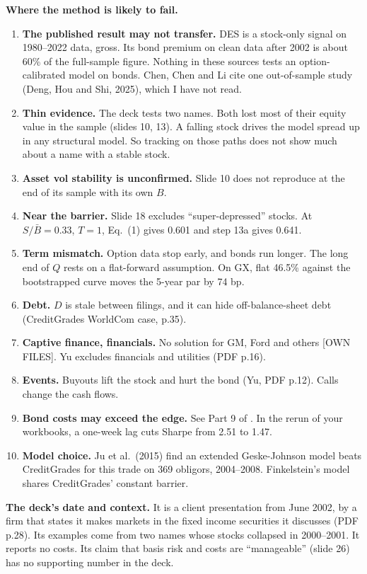 \documentclass[10pt,a4paper]{article}
\newcommand{\OWN}{\textsf{\footnotesize\textcolor{tagother}{[OWN FILES]}}}
\newcommand{\Bbar}{\bar{B}}
\begin{document}
\textbf{Where the method is likely to fail.}
\begin{enumerate}[nosep]
\item \textbf{The published result may not transfer.} DES is a stock-only signal on 1980--2022 data, gross. Its bond premium on clean data after 2002 is about 60\% of the full-sample figure. Nothing in these sources tests an option-calibrated model on bonds. Chen, Chen and Li cite one out-of-sample study (Deng, Hou and Shi, 2025), which I have not read.
\item \textbf{Thin evidence.} The deck tests two names. Both lost most of their equity value in the sample (slides 10, 13). A falling stock drives the model spread up in any structural model. So tracking on those paths does not show much about a name with a stable stock.
\item \textbf{Asset vol stability is unconfirmed.} Slide 10 does not reproduce at the end of its sample with its own $B$.
\item \textbf{Near the barrier.} Slide 18 excludes ``super-depressed'' stocks. At $S/\Bbar=0.33$, $T=1$, Eq.\ (1) gives 0.601 and step 13a gives 0.641.
\item \textbf{Term mismatch.} Option data stop early, and bonds run longer. The long end of $Q$ rests on a flat-forward assumption. On GX, flat 46.5\% against the bootstrapped curve moves the 5-year par by 74 bp.
\item \textbf{Debt.} $D$ is stale between filings, and it can hide off-balance-sheet debt (CreditGrades WorldCom case, p.35).
\item \textbf{Captive finance, financials.} No solution for GM, Ford and others \OWN. Yu excludes financials and utilities (PDF p.16).
\item \textbf{Events.} Buyouts lift the stock and hurt the bond (Yu, PDF p.12). Calls change the cash flows.
\item \textbf{Bond costs may exceed the edge.} See Part 9 of . In the rerun of your workbooks, a one-week lag cuts Sharpe from 2.51 to 1.47.
\item \textbf{Model choice.} Ju et al.\ (2015) find an extended Geske-Johnson model beats CreditGrades for this trade on 369 obligors, 2004--2008. Finkelstein's model shares CreditGrades' constant barrier.
\end{enumerate}

\textbf{The deck's date and context.} It is a client presentation from June 2002, by a firm that states it makes markets in the fixed income securities it discusses (PDF p.28). Its examples come from two names whose stocks collapsed in 2000--2001. It reports no costs. Its claim that basis risk and costs are ``manageable'' (slide 26) has no supporting number in the deck.
\end{document}
